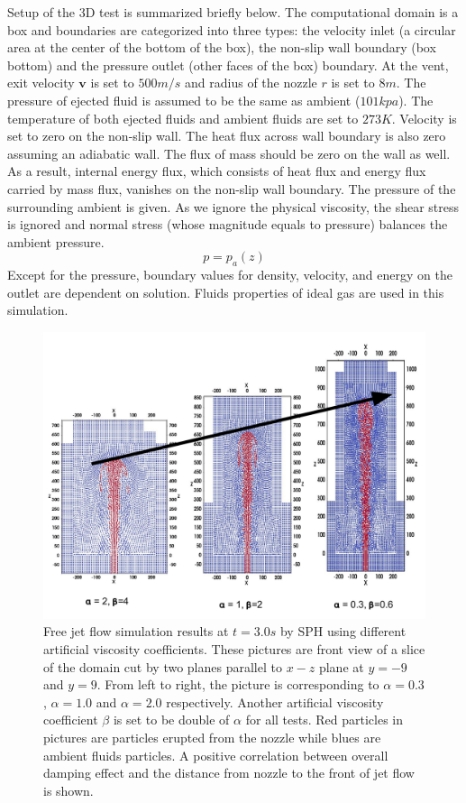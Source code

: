 \documentclass[preprint,12pt,authoryear]{elsarticle}
\begin{document}
Setup of the 3D test is summarized briefly below. The computational domain is a box and boundaries are categorized into three types: the velocity inlet (a circular area at the center of the bottom of the box), the non-slip wall boundary (box bottom) and the pressure outlet (other faces of the box) boundary. At the vent, exit velocity $\textbf{v}$ is set to $500 m / s$ and radius of the nozzle $r$ is set to $8m $. The pressure of ejected fluid is assumed to be the same as ambient ($101 kpa$). The temperature of both ejected fluids and ambient fluids are set to $273 K$. 
Velocity is set to zero on the non-slip wall. The heat flux across wall boundary is also zero assuming an adiabatic wall. The flux of mass should be zero on the wall as well. As a result, internal energy flux, which consists of heat flux and energy flux carried by mass flux, vanishes on the non-slip wall boundary. 
The pressure of the surrounding ambient is given. As we ignore the physical viscosity, the shear stress is ignored and normal stress (whose magnitude equals to pressure) balances the ambient pressure.
\begin{equation}
p = p_a\left(z\right)  \label{eq:pressure_bc_p} 
\end{equation} 
Except for the pressure, boundary values for density, velocity, and energy on the outlet are dependent on solution. Fluids properties of ideal gas are used in this simulation.

\begin{figure}[H]
   \centering
   \includegraphics[width=0.95 \textwidth]{./Figures/SPH-3D-jet}
   \caption{Free jet flow simulation results at $t=3.0 s$ by SPH using different artificial viscosity coefficients. These pictures are front view of a slice of the domain cut by two planes parallel to $x-z$ plane at $y=-9$ and $y=9$. From left to right, the picture is corresponding to $\alpha=0.3$, $\alpha=1.0$ and $\alpha=2.0$ respectively. Another artificial viscosity coefficient $\beta$ is set to be double of $\alpha$ for all tests. Red particles in pictures are particles erupted from the nozzle while blues are ambient fluids particles. A positive correlation between overall damping effect and the distance from nozzle to the front of jet flow is shown.}
    \label{fig:free-jet-SPH-comparison}
\end{figure}
\end{document}
